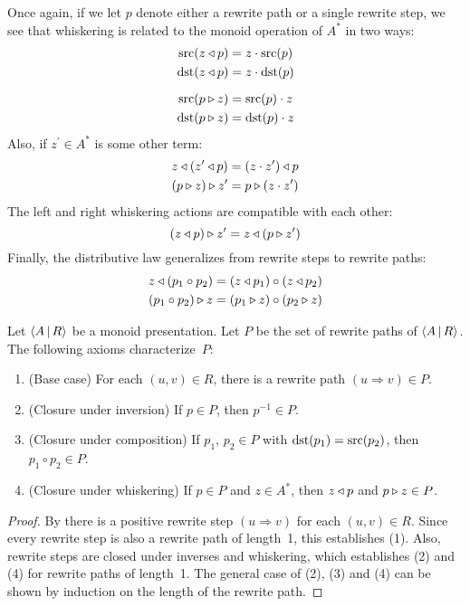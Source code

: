 \documentclass[../generics]{subfiles}
\begin{document}
\begin{definition}
Once again, if we let $p$ denote either a rewrite path or a single rewrite step, we see that whiskering is related to the monoid operation of $A^*$ in two ways:
\begin{gather*}
\operatorname{src}(z\triangleleft p)=z\cdot \operatorname{src}(p)\\
\operatorname{dst}(z\triangleleft p)=z\cdot \operatorname{dst}(p)\\[\medskipamount]
\operatorname{src}(p\triangleright z)=\operatorname{src}(p)\cdot z\\
\operatorname{dst}(p\triangleright z)=\operatorname{dst}(p)\cdot z
\end{gather*}
Also, if $z^\prime\in A^*$ is some other term:
\begin{gather*}
z\triangleleft (z^\prime \triangleleft p)=(z\cdot z^\prime) \triangleleft p\\
(p\triangleright z)\triangleright z^\prime=p\triangleright (z\cdot z^\prime)
\end{gather*}
The left and right whiskering actions are compatible with each other:
\[(z\triangleleft p)\triangleright z^\prime = z\triangleleft(p\triangleright z^\prime)\]
Finally, the distributive law generalizes from rewrite steps to rewrite paths:
\begin{gather*}
z\triangleleft (p_1 \circ p_2) = (z\triangleleft p_1) \circ (z\triangleleft p_2)\\
(p_1 \circ p_2)\triangleright z = (p_1\triangleright z) \circ (p_2\triangleright z)
\end{gather*}
\end{definition}

\begin{proposition}
Let $\langle A\,|\,R\rangle$ be a monoid presentation. Let $P$ be the set of rewrite paths of $\langle A\,|\,R\rangle$. The following axioms characterize~$P$:
\begin{enumerate}
\item (Base case) For each $(u,v)\in R$, there is a rewrite path $(u\Rightarrow v)\in P$.
\item (Closure under inversion) If $p\in P$, then $p^{-1}\in P$.
\item (Closure under composition) If $p_1$, $p_2\in P$ with $\operatorname{dst}(p_1)=\operatorname{src}(p_2)$, then $p_1\circ p_2\in P$.
\item (Closure under whiskering) If $p\in P$ and $z\in A^*$, then $z\triangleleft p$ and $p\triangleright z\in P$.
\end{enumerate}
\end{proposition}
\begin{proof}
By  there is a positive rewrite step $(u\Rightarrow v)$ for each $(u,v)\in R$. Since every rewrite step is also a rewrite path of length~1, this establishes (1). Also, rewrite steps are closed under inverses and whiskering, which establishes (2) and (4) for rewrite paths of length~1. The general case of (2), (3) and (4) can be shown by induction on the length of the rewrite path.
\end{proof}
\end{document}
